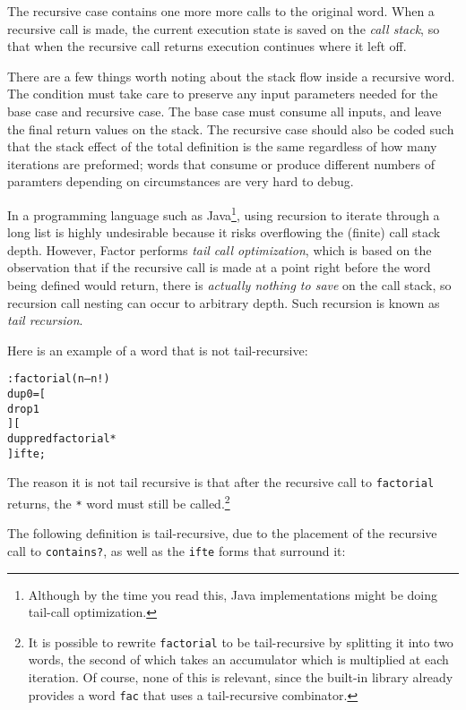 \documentclass[english]{article}
\begin{document}
The recursive case contains one more more calls to the original word. When a recursive call is made, the current execution state is saved on the \emph{call stack}, so that when the recursive call returns execution continues where it left off.

There are a few things worth noting about the stack flow inside a recursive word. The condition must take care to preserve any input parameters needed for the base case and recursive case. The base case must consume all inputs, and leave the final return values on the stack. The recursive case should also be coded such that the stack effect of the total definition is the same regardless of how many iterations are preformed; words that consume or produce different numbers of paramters depending on circumstances are very hard to debug.

In a programming language such as Java\footnote{Although by the time you read this, Java implementations might be doing tail-call optimization.}, using recursion to iterate through a long list is highly undesirable because it risks overflowing the (finite) call stack depth. However, Factor performs \emph{tail call optimization}, which is based on the observation that if the recursive call is made at a point right before the word being defined would return, there is \emph{actually nothing to save} on the call stack, so recursion call nesting can occur to arbitrary depth. Such recursion is known as \emph{tail recursion}.

Here is an example of a word that is not tail-recursive:

\begin{alltt}
: factorial ( n -- n! )
    dup 0 = {[}
        drop 1
    {] [}
        dup pred factorial *
    {]} ifte ;
\end{alltt}

The reason it is not tail recursive is that after the recursive call to \texttt{factorial} returns, the \texttt{*} word must still be called.\footnote{
It is possible to rewrite \texttt{factorial} to be tail-recursive by splitting it into two words, the second of which takes an accumulator which is multiplied at each iteration. Of course, none of this is relevant, since the built-in library already provides a word \texttt{fac} that uses a tail-recursive combinator.}

The following definition is tail-recursive, due to the placement of the recursive call to \texttt{contains?}, as well as the \texttt{ifte} forms that surround it:
\end{document}
